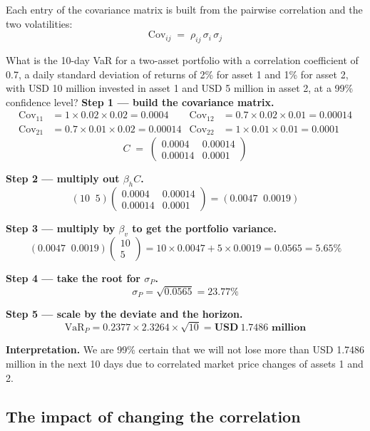 Each entry of the covariance matrix is built from the pairwise correlation and the two
volatilities:
\[ \mathrm{Cov}_{ij} \;=\; \rho_{ij}\, \sigma_i\, \sigma_j \]

\begin{mrexbox}[title={Example --- 10-day VaR for a two-asset trading book}]
What is the 10-day VaR for a two-asset portfolio with a correlation coefficient of 0.7, a daily
standard deviation of returns of 2\% for asset 1 and 1\% for asset 2, with USD 10 million
invested in asset 1 and USD 5 million in asset 2, at a 99\% confidence level?
\tcblower
\small
\textbf{Step 1 --- build the covariance matrix.}
\begin{align*}
\mathrm{Cov}_{11} &= 1 \times 0.02 \times 0.02 = 0.0004 &
\mathrm{Cov}_{12} &= 0.7 \times 0.02 \times 0.01 = 0.00014\\
\mathrm{Cov}_{21} &= 0.7 \times 0.01 \times 0.02 = 0.00014 &
\mathrm{Cov}_{22} &= 1 \times 0.01 \times 0.01 = 0.0001
\end{align*}
\[ C \;=\; \begin{pmatrix} 0.0004 & 0.00014 \\ 0.00014 & 0.0001 \end{pmatrix} \]

\textbf{Step 2 --- multiply out $\beta_h C$.}
\[ (10 \;\; 5)\begin{pmatrix} 0.0004 & 0.00014 \\ 0.00014 & 0.0001 \end{pmatrix}
   = (0.0047 \;\; 0.0019) \]

\textbf{Step 3 --- multiply by $\beta_v$ to get the portfolio variance.}
\[ (0.0047 \;\; 0.0019)\begin{pmatrix} 10 \\ 5 \end{pmatrix}
   = 10 \times 0.0047 + 5 \times 0.0019 = 0.0565 = 5.65\% \]

\textbf{Step 4 --- take the root for $\sigma_P$.}
\[ \sigma_P = \sqrt{0.0565} = 23.77\% \]

\textbf{Step 5 --- scale by the deviate and the horizon.}
\[ \mathrm{VaR}_P = 0.2377 \times 2.3264 \times \sqrt{10} = \mathbf{USD\ 1.7486 \text{ million}} \]

\medskip
\textbf{Interpretation.} We are 99\% certain that we will not lose more than USD 1.7486 million
in the next 10 days due to correlated market price changes of assets 1 and 2.
\end{mrexbox}

\subsection{The impact of changing the correlation}

